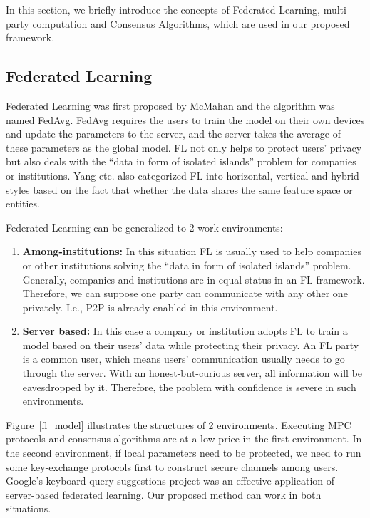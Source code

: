 In this section, we briefly introduce the concepts of Federated Learning, multi-party computation and Consensus Algorithms, which are used in our proposed framework.

\subsection{Federated Learning}
Federated Learning was first proposed by McMahan and the algorithm was named FedAvg\cite{mcmahan2016communicationefficient}. FedAvg requires the users to train the model on their own devices and update the parameters to the server, and the server takes the average of these parameters as the global model. FL not only helps to protect users' privacy but also deals with the ``data in form of isolated islands'' problem for companies or institutions. Yang etc. also categorized FL into horizontal, vertical and hybrid styles based on the fact that whether the data shares the same feature space or entities\cite{yang2019federated}. 

Federated Learning can be generalized to 2 work environments:

\begin{enumerate}

    \item \textbf{Among-institutions:} In this situation FL is usually used to help companies or other institutions solving the ``data in form of isolated islands'' problem. Generally, companies and institutions are in equal status in an FL framework. Therefore, we can suppose one party can communicate with any other one privately. I.e., P2P is already enabled in this environment.

    \item \textbf{Server based:} In this case a company or institution adopts FL to train a model based on their users' data while protecting their privacy. An FL party is a common user, which means users' communication usually needs to go through the server. With an honest-but-curious server, all information will be eavesdropped by it. Therefore, the problem with confidence is severe in such environments.

\end{enumerate}

Figure~\ref{fl_model} illustrates the structures of 2 environments. Executing MPC protocols and consensus algorithms are at a low price in the first environment. In the second environment, if local parameters need to be protected, we need to run some key-exchange protocols first to construct secure channels among users. Google's keyboard query suggestions\cite{yang2018applied} project was an effective application of server-based federated learning. Our proposed method can work in both situations.

